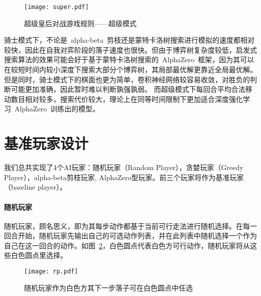 \begin{figure}[htb]
    \centering
    \texttt{[image: super.pdf]}
    \caption[rules-super]{%
        超级皇后对战游戏规则——超级模式%
      }
    \label{fig:super}
\end{figure}
骑士模式下，不论是~alpha-beta~剪枝还是蒙特卡洛树搜索进行模拟的速度都相对较快，因此在自我对弈阶段的落子速度也很快。但由于博弈树复杂度较低，启发式搜索算法的效果可能会好于基于蒙特卡洛树搜索的~AlphaZero~框架，因为其可以在较短时间内较小深度下搜索大部分个博弈树，其局部最优解更靠近全局最优解。
但是同时，骑士模式下的棋面也更为简单，卷积神经网络较容易收敛，对胜负的判断可能更加准确，因此暂时难以判断孰强孰弱。
而超级模式下每回合平均合法移动数目相对较多，搜索代价较大，理论上在同等时间限制下更加适合深度强化学习~AlphaZero~训练出的模型。

\section{基准玩家设计}
我们总共实现了4个AI玩家：随机玩家（Random Player），贪婪玩家（Greedy Player），alpha-beta剪枝玩家, AlphaZero型玩家。前三个玩家将作为基准玩家（baseline player）。
\paragraph{随机玩家}
随机玩家，顾名思义，即为其每步动作都基于当前可行走法进行随机选择。在每一回合开始，随机玩家先输出自己的可选动作列表，并在此列表中随机选择一个作为自己在这一回合的动作。如图~\ref{fig:super}，白色圆点代表白色方可行动作，随机玩家将从这些白色圆点里选择。
\begin{figure}[htb]
    \centering
    \texttt{[image: rp.pdf]}
    \caption[rp]{%
        随机玩家作为白色方其下一步落子可在白色圆点中任选%
      }
    \label{fig:super}
\end{figure}
